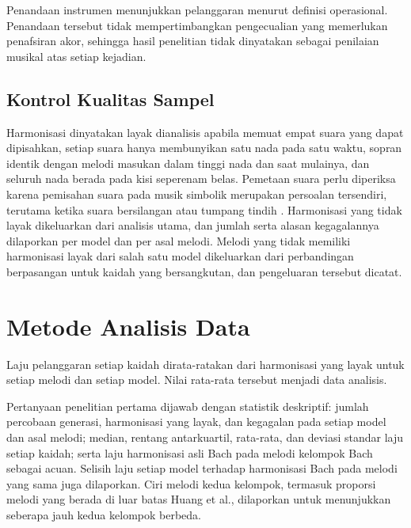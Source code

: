 Penandaan instrumen menunjukkan pelanggaran menurut definisi operasional. Penandaan tersebut tidak mempertimbangkan pengecualian yang memerlukan penafsiran akor, sehingga hasil penelitian tidak dinyatakan sebagai penilaian musikal atas setiap kejadian.

\subsection{Kontrol Kualitas Sampel}

Harmonisasi dinyatakan layak dianalisis apabila memuat empat suara yang dapat dipisahkan, setiap suara hanya membunyikan satu nada pada satu waktu, sopran identik dengan melodi masukan dalam tinggi nada dan saat mulainya, dan seluruh nada berada pada kisi seperenam belas. Pemetaan suara perlu diperiksa karena pemisahan suara pada musik simbolik merupakan persoalan tersendiri, terutama ketika suara bersilangan atau tumpang tindih \parencite{karystinaios2023}. Harmonisasi yang tidak layak dikeluarkan dari analisis utama, dan jumlah serta alasan kegagalannya dilaporkan per model dan per asal melodi. Melodi yang tidak memiliki harmonisasi layak dari salah satu model dikeluarkan dari perbandingan berpasangan untuk kaidah yang bersangkutan, dan pengeluaran tersebut dicatat.

\section{Metode Analisis Data}

Laju pelanggaran setiap kaidah dirata-ratakan dari harmonisasi yang layak untuk setiap melodi dan setiap model. Nilai rata-rata tersebut menjadi data analisis.

Pertanyaan penelitian pertama dijawab dengan statistik deskriptif: jumlah percobaan generasi, harmonisasi yang layak, dan kegagalan pada setiap model dan asal melodi; median, rentang antarkuartil, rata-rata, dan deviasi standar laju setiap kaidah; serta laju harmonisasi asli Bach pada melodi kelompok Bach sebagai acuan. Selisih laju setiap model terhadap harmonisasi Bach pada melodi yang sama juga dilaporkan. Ciri melodi kedua kelompok, termasuk proporsi melodi yang berada di luar batas Huang et al., dilaporkan untuk menunjukkan seberapa jauh kedua kelompok berbeda.

